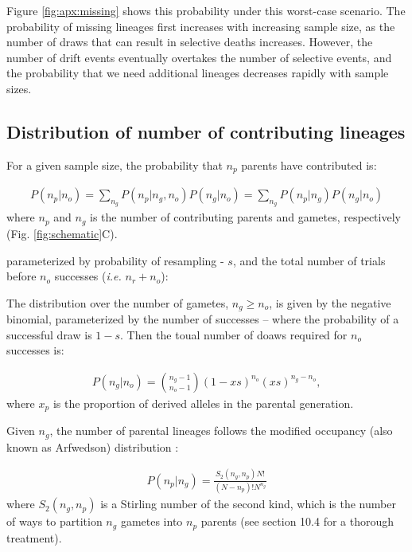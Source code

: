 \documentclass[review]{elsarticle}
\begin{document}
Figure \ref{fig:apx:missing} shows this probability under this worst-case scenario. The probability
of missing lineages first increases with increasing sample size, as the number of draws that can
result in selective deaths increases. However, the number of drift events eventually overtakes the
number of selective events, and the probability that we need additional lineages decreases rapidly
with sample sizes.


\subsection{Distribution of number of contributing lineages}
\label{subsec:distribution}

For a given sample size, the probability that $n_p$ parents have contributed is:

\begin{align}
  \label{eq:conditional}
  P(n_p | n_o) = \sum_{n_g} P(n_p | n_g,n_o)P(n_g | n_o) = \sum_{n_g} P(n_p | n_g)P(n_g | n_o) 
\end{align}
where $n_p$ and $n_g$ is the number of contributing parents and gametes, respectively (Fig.
\ref{fig:schematic}C). 

 parameterized by
probability of resampling - $s$, and the total number of trials before $n_o$ successes (\textit{i.e.}
$n_r+n_o$):

The distribution over the number of gametes, $n_g \geq n_o$, is given by the negative binomial,
parameterized by the number of successes -- where the probability of a successful draw is $1-s$.
Then the toual number of doaws required for $n_o$ successes is:

\begin{align}
  \label{eq:neg-binomial-trials}
  P(n_g|n_o) = \binom{n_g-1}{n_o-1}(1-xs)^{n_o}(xs)^{n_g-n_o},
\end{align}
where $x_p$ is the proportion of derived alleles in the parental generation.

Given $n_g$, the number of parental lineages follows the modified occupancy (also known as
Arfwedson) distribution \citep{Wakeley2009,ONeill2019,JohnsonEtAl2005}:

\begin{align}
  \label{eq:occupancy}
  P(n_p|n_g) = \frac{S_2(n_g,n_p) N!}{(N-n_p)! N^{n_g}}
\end{align}
where $S_2(n_g,n_p)$ is a Stirling number of the second kind, which is the number of ways to
partition $n_g$ gametes into $n_p$ parents (see \cite{JohnsonEtAl2005} section 10.4 for a thorough
treatment). %
\end{document}
